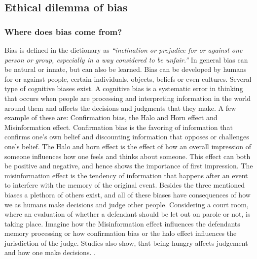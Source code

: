 \documentclass[11pt, fleqn, titlepage]{article}
\begin{document}
	\subsection{Ethical dilemma of bias}\label{ethical_dilemma_of_bias}
	
	\subsubsection{Where does bias come from?}\label{rootofbias}
	Bias is defined in the dictionary as \textit{\enquote{inclination or prejudice for or against one person or group, especially in a way considered to be unfair.}} In general bias can be natural or innate,  but can also be learned. Bias can be developed by humans for or against people, certain individuals, objects, beliefs or even cultures. Several type of cognitive biases exist. A cognitive bias is a systematic error in thinking that occurs when people are processing and interpreting information in the world around them and affects the decisions and judgments that they make. \cite{verywellmind} A few example of these are: Confirmation bias, the Halo and Horn effect and Misinformation effect. Confirmation bias is the favoring of information that confirms one's own belief and discounting information that opposes or challenges one's belief. The Halo and horn effect is the effect of how an overall impression of someone influences how one feels and thinks about someone. This effect can both be positive and negative, and hence shows the importance of first impression. The misinformation effect is the tendency of information that happens after an event to interfere with the memory of the original event. Besides the three mentioned biases a plethora of others exist, and all of these biases have consequences of how we as humans make decisions and judge other people. Considering a court room, where an evaluation of whether a defendant should be let out on parole or not, is taking place. Imagine how the Misinformation effect influences the defendants memory processing or how confirmation bias or the halo effect influences the jurisdiction of the judge. Studies also show, that being hungry affects judgement  and how one make decisions. \cite{eat}. \newline \indent
\end{document}
